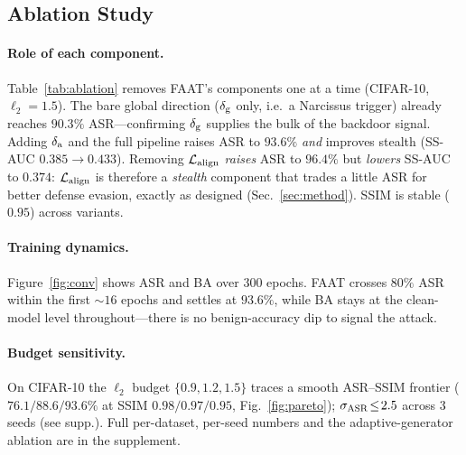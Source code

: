 \subsection{Ablation Study}
\label{sec:ablation}





\paragraph{Role of each component.}
Table~\ref{tab:ablation} removes FAAT's components one at a time (CIFAR-10,
$\ell_2\!=\!1.5$). The bare global direction ($\delta_{\mathrm{g}}$ only, i.e.\ a Narcissus
trigger) already reaches $90.3\%$ ASR---confirming $\delta_{\mathrm{g}}$ supplies the bulk
of the backdoor signal. Adding $\delta_{\mathrm{a}}$ and the full pipeline raises ASR to
$93.6\%$ \emph{and} improves stealth (SS-AUC $0.385\!\to\!0.433$). Removing
$\mathcal{L}_{\mathrm{align}}$ \emph{raises} ASR to $96.4\%$ but \emph{lowers} SS-AUC to $0.374$:
$\mathcal{L}_{\mathrm{align}}$ is therefore a \emph{stealth} component that trades a little ASR for
better defense evasion, exactly as designed (Sec.~\ref{sec:method}). SSIM is
stable ($0.95$) across variants.

\paragraph{Training dynamics.}
Figure~\ref{fig:conv} shows ASR and BA over $300$ epochs. FAAT crosses
$80\%$ ASR within the first $\sim$$16$ epochs and settles at $93.6\%$, while BA
stays at the clean-model level throughout---there is no benign-accuracy dip to
signal the attack.

\paragraph{Budget sensitivity.}
On CIFAR-10 the $\ell_2$ budget $\{0.9,1.2,1.5\}$ traces a smooth ASR--SSIM
frontier ($76.1 / 88.6 / 93.6\%$ at SSIM $0.98/0.97/0.95$, Fig.~\ref{fig:pareto});
$\sigma_{\mathrm{ASR}}\!\le\!2.5$ across 3 seeds (see supp.).
Full per-dataset, per-seed numbers and the adaptive-generator ablation are in
the supplement.
